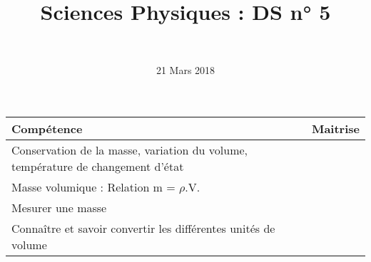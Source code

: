 \documentclass[a4paper,11pt]{exam}
\author{\ }
\date{21 Mars 2018}
\title{Sciences Physiques : DS n° 5}
\begin{document}
%	


	\maketitle


\begin{small}
	\begin{center}
		\begin{tabular}{|@{\ }l@{}|@{\ }c@{\ }|}
			\hline
			\textbf{Compétence} & \textbf{Maitrise} \\
			\hline
			Conservation de la masse, variation du volume, température de changement d’état \ \ &  \ \ \ \\
			\hline
			Masse volumique : Relation m = $\rho$.V. &  \\
			\hline			
			Mesurer une masse &  \\
			\hline
			Connaître et savoir convertir les différentes unités de volume &  \\
			\hline
		\end{tabular}
	\end{center}
\end{small}	
\vspace*{-0.5cm}	









\newpage 






\label{LastPage}
\end{document}
